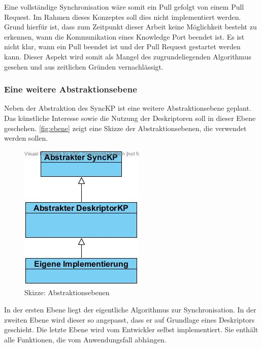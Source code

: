 \documentclass[a4paper]{article}
\begin{document}
	Eine vollständige Synchronisation wäre somit ein Pull gefolgt von einem
	Pull Request. Im Rahmen dieses Konzeptes soll dies nicht implementiert werden.
	Grund hierfür ist, dass zum	Zeitpunkt dieser Arbeit keine Möglichkeit besteht 
	zu erkennen, wann die Kommunikation eines Knowledge Port beendet ist. 
	Es ist nicht klar, wann ein Pull beendet ist und der Pull Request gestartet 
	werden kann. Dieser Aspekt wird somit als Mangel des zugrundeliegenden
	Algorithmus gesehen und aus zeitlichen Gründen vernachlässigt.
	
	\subsubsection{Eine weitere Abstraktionsebene}	
	
	Neben der Abstraktion des SyncKP ist eine weitere Abstraktionsebene geplant.
	Das künstliche Interesse sowie die Nutzung der Deskriptoren soll in
	dieser Ebene geschehen. \autoref{fig:ebene} zeigt eine Skizze der
	Abstraktionsebenen,	die verwendet werden sollen.
	
	\begin{figure}[H]
		\centerline{
			\includegraphics[scale=0.6]{../Bilder/ebene.jpg}
		}
		\caption{Skizze: Abstraktionsebenen}
		\label{fig:ebene}
	\end{figure}	
	
	In der ersten Ebene liegt der eigentliche Algorithmus zur Synchronisation.
	In der zweiten Ebene wird dieser so angepasst, dass er auf Grundlage
	eines Deskriptors geschieht. Die letzte Ebene wird vom Entwickler selbst
	implementiert. Sie enthält alle Funktionen, die vom Anwendungsfall abhängen. \\
	
\end{document}
